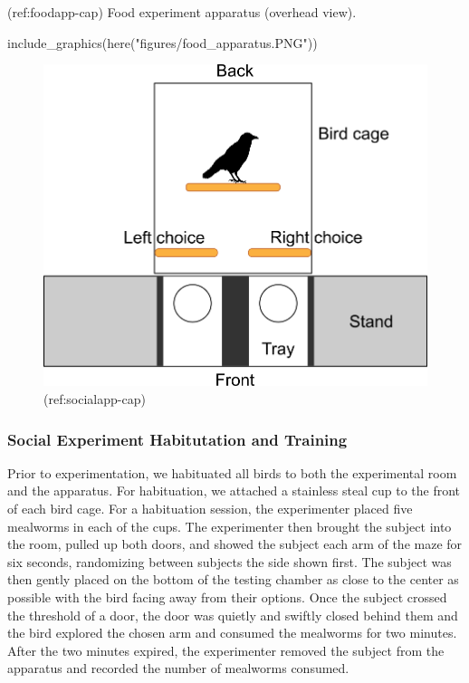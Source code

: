 \documentclass[
]{article}
\newenvironment{Shaded}{\begin{snugshade}}{\end{snugshade}}
\newcommand{\FunctionTok}[1]{\textcolor[rgb]{0.00,0.00,0.00}{#1}}
\newcommand{\NormalTok}[1]{#1}
\newcommand{\StringTok}[1]{\textcolor[rgb]{0.31,0.60,0.02}{#1}}
\begin{document}
(ref:foodapp-cap) Food experiment apparatus (overhead view).

\begin{Shaded}
\begin{Highlighting}[]
\FunctionTok{include\_graphics}\NormalTok{(}\FunctionTok{here}\NormalTok{(}\StringTok{"figures/food\_apparatus.PNG"}\NormalTok{))}
\end{Highlighting}
\end{Shaded}

\begin{figure}

{\centering \includegraphics[width=1\linewidth]{../figures/food_apparatus} 

}

\caption{(ref:socialapp-cap)}\label{fig:foodapp}
\end{figure}

\hypertarget{social-experiment-habitutation-and-training}{%
\subsubsection{Social Experiment Habitutation and
Training}\label{social-experiment-habitutation-and-training}}

Prior to experimentation, we habituated all birds to both the
experimental room and the apparatus. For habituation, we attached a
stainless steal cup to the front of each bird cage. For a habituation
session, the experimenter placed five mealworms in each of the cups. The
experimenter then brought the subject into the room, pulled up both
doors, and showed the subject each arm of the maze for six seconds,
randomizing between subjects the side shown first. The subject was then
gently placed on the bottom of the testing chamber as close to the
center as possible with the bird facing away from their options. Once
the subject crossed the threshold of a door, the door was quietly and
swiftly closed behind them and the bird explored the chosen arm and
consumed the mealworms for two minutes. After the two minutes expired,
the experimenter removed the subject from the apparatus and recorded the
number of mealworms consumed.
\end{document}
